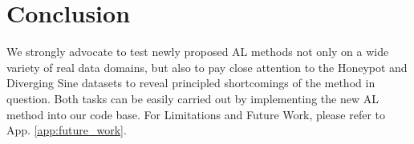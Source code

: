 \documentclass[]{article}
\begin{document}
\section{Conclusion}
We strongly advocate to test newly proposed AL methods not only on a wide variety of real data domains, but also to pay close attention to the Honeypot and Diverging Sine datasets to reveal principled shortcomings of the method in question.
Both tasks can be easily carried out by implementing the new AL method into our code base.
For Limitations and Future Work, please refer to App. \ref{app:future_work}.






 

\newpage
\end{document}
